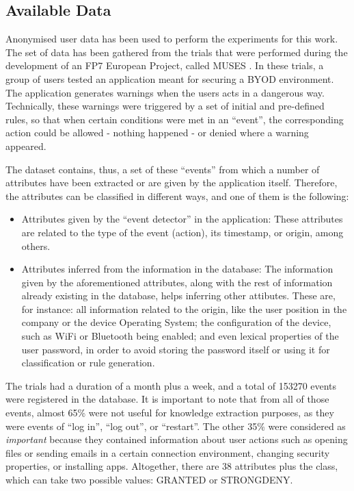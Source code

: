 \documentclass[a4paper,10pt,twocolumn,preprint,3p]{elsarticle}
\begin{document}
\subsection{Available Data}
\label{subsec:data}

Anonymised user data has been used to perform the experiments for this work. The set of data has been gathered from the trials that were performed during the development of an FP7 European Project, called MUSES \cite{DBLP:conf/sac/MoraCGZJEBAH14}. In these trials, a group of users tested an application meant for securing a BYOD environment. The application generates warnings when the users acts in a dangerous way. Technically, these warnings were triggered by a set of initial and pre-defined rules, so that when certain conditions were met in an ``event'', the corresponding action could be allowed - nothing happened - or denied where a warning appeared.

The dataset contains, thus, a set of these ``events'' from which a number of attributes have been extracted or are given by the application itself. Therefore, the attributes can be classified in different ways, and one of them is the following:
\begin{itemize}
  \item Attributes given by the ``event detector'' in the application: These attributes are related to the type of the event (action), its timestamp, or origin, among others.
  \item Attributes inferred from the information in the database: The information given by the aforementioned attributes, along with the rest of information already existing in the database, helps inferring other attibutes.
       These are, for instance: all information related to the origin, like the user position in the company or the device Operating System; the configuration of the device, such as WiFi or Bluetooth being enabled; and even lexical properties of the user password, in order to avoid storing the password itself or using it for classification or rule generation.
\end{itemize}

The trials had a duration of a month plus a week, and a total of 153270 events were registered in the database. It is important to note that from all of those events, almost 65\% were not useful for knowledge extraction purposes, as they were events of ``log in'', ``log out'', or ``restart''. The other 35\% were considered as \textit{important} because they contained information about user actions such as opening files or sending emails in a certain connection environment, changing security properties, or installing apps. Altogether, there are 38 attributes plus the class, which can take two possible values: GRANTED or STRONGDENY.
\end{document}

